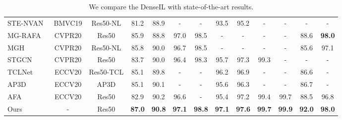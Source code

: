 \documentclass[10pt,twocolumn,letterpaper]{article}
\begin{document}
\begin{table*}[t]
\begin{tabular}{@{}lcccccccccccc@{}}
	\multicolumn{1}{l|}{STE-NVAN~\cite{liu2019spatially}} & \multicolumn{1}{c|}{BMVC19} & \multicolumn{1}{c|}{Res50-NL} & 81.2 & 88.9 & - & \multicolumn{1}{c|}{-} & 93.5 & 95.2 & - & \multicolumn{1}{c|}{-} & - & \multicolumn{1}{c}{-}  \\
	\multicolumn{1}{l|}{MG-RAFA~\cite{zhang2020multi}} & \multicolumn{1}{c|}{CVPR20} & \multicolumn{1}{c|}{Res50} & 85.9 & 88.8 & 97.0 & \multicolumn{1}{c|}{98.5} & - & - & - & \multicolumn{1}{c|}{-} & 88.6 & \multicolumn{1}{c}{\textbf{98.0}}  \\
	\multicolumn{1}{l|}{MGH~\cite{yan2020learning}} & \multicolumn{1}{c|}{CVPR20} & \multicolumn{1}{c|}{Res50-NL} & 85.8 & 90.0 & 96.7 & \multicolumn{1}{c|}{98.5} & - & - & - & \multicolumn{1}{c|}{-} & 85.6 & \multicolumn{1}{c}{97.1}  \\
	\multicolumn{1}{l|}{STGCN~\cite{yang2020spatial}} & \multicolumn{1}{c|}{CVPR20} & \multicolumn{1}{c|}{Res50} & 83.7 & 90.0 & 96.4 & \multicolumn{1}{c|}{98.3} & 95.7 & 97.3 & 99.3 & \multicolumn{1}{c|}{-} & - & \multicolumn{1}{c}{-}  \\
	\multicolumn{1}{l|}{TCLNet~\cite{hou2020temporal}} & \multicolumn{1}{c|}{ECCV20} & \multicolumn{1}{c|}{Res50-TCL} & 85.1 & 89.8 & - & \multicolumn{1}{c|}{-} & 96.2 & 96.9 & - & \multicolumn{1}{c|}{-} & 86.6 & \multicolumn{1}{c}{-}  \\
	\multicolumn{1}{l|}{AP3D~\cite{gu2020appearance}} & \multicolumn{1}{c|}{ECCV20} & \multicolumn{1}{c|}{AP3D} & 85.1 & 90.1 & - & \multicolumn{1}{c|}{-} & 95.6 & 96.3 & - & \multicolumn{1}{c|}{-} & 86.7 & \multicolumn{1}{c}{-}  \\
	\multicolumn{1}{l|}{AFA~\cite{chen2020temporal}} & \multicolumn{1}{c|}{ECCV20} & \multicolumn{1}{c|}{Res50} & 82.9 & 90.2 & 96.6 & \multicolumn{1}{c|}{-} & 95.4 & 97.2 & 99.4 & \multicolumn{1}{c|}{99.7} & 88.5 & \multicolumn{1}{c}{96.8}  \\ \midrule
\multicolumn{1}{l|}{Ours} & \multicolumn{1}{c|}{-} & \multicolumn{1}{c|}{Res50} & \textbf{87.0} & \textbf{90.8} & \textbf{97.1} & \multicolumn{1}{c|}{\textbf{98.8}} & \textbf{97.1} & \textbf{97.6} & \textbf{99.7} & \multicolumn{1}{c|}{\textbf{99.9}}  & \textbf{92.0} & \multicolumn{1}{c}{\textbf{98.0}}   \\ 
	\bottomrule[1.5pt]
	\end{tabular}
\caption{We compare the DenseIL with state-of-the-art results.}
	\vspace{-3mm}
	\label{tab:sota}
\end{table*}
\end{document}
